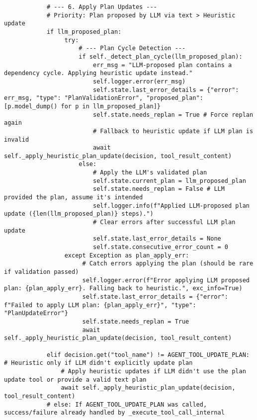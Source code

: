 \documentclass[12pt,a4paper]{article}
\begin{document}
\begin{pageablecode}
\begin{verbatim}
            # --- 6. Apply Plan Updates ---
            # Priority: Plan proposed by LLM via text > Heuristic update
            if llm_proposed_plan:
                 try:
                     # --- Plan Cycle Detection ---
                     if self._detect_plan_cycle(llm_proposed_plan):
                         err_msg = "LLM-proposed plan contains a dependency cycle. Applying heuristic update instead."
                         self.logger.error(err_msg)
                         self.state.last_error_details = {"error": err_msg, "type": "PlanValidationError", "proposed_plan": [p.model_dump() for p in llm_proposed_plan]}
                         self.state.needs_replan = True # Force replan again
                         # Fallback to heuristic update if LLM plan is invalid
                         await self._apply_heuristic_plan_update(decision, tool_result_content)
                     else:
                         # Apply the LLM's validated plan
                         self.state.current_plan = llm_proposed_plan
                         self.state.needs_replan = False # LLM provided the plan, assume it's intended
                         self.logger.info(f"Applied LLM-proposed plan update ({len(llm_proposed_plan)} steps).")
                         # Clear errors after successful LLM plan update
                         self.state.last_error_details = None
                         self.state.consecutive_error_count = 0
                 except Exception as plan_apply_err:
                      # Catch errors applying the plan (should be rare if validation passed)
                      self.logger.error(f"Error applying LLM proposed plan: {plan_apply_err}. Falling back to heuristic.", exc_info=True)
                      self.state.last_error_details = {"error": f"Failed to apply LLM plan: {plan_apply_err}", "type": "PlanUpdateError"}
                      self.state.needs_replan = True
                      await self._apply_heuristic_plan_update(decision, tool_result_content)

            elif decision.get("tool_name") != AGENT_TOOL_UPDATE_PLAN: # Heuristic only if LLM didn't explicitly update plan
                # Apply heuristic updates if LLM didn't use the plan update tool or provide a valid text plan
                await self._apply_heuristic_plan_update(decision, tool_result_content)
            # else: If AGENT_TOOL_UPDATE_PLAN was called, success/failure already handled by _execute_tool_call_internal


\end{verbatim}
\end{pageablecode}
\end{document}

